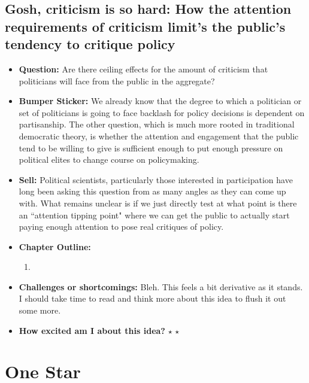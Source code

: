 \documentclass[12pt]{article}
\begin{document}
\subsection{Gosh, criticism is so hard: How the attention requirements of criticism limit's the public's tendency to critique policy}
    \begin{itemize}
        \item \textbf{Question:} Are there ceiling effects for the amount of criticism that politicians will face from the public in the aggregate?
        \item \textbf{Bumper Sticker:} We already know that the degree to which a politician or set of politicians is going to face backlash for policy decisions is dependent on partisanship. The other question, which is much more rooted in traditional democratic theory, is whether the attention and engagement that the public tend to be willing to give is sufficient enough to put enough pressure on political elites to change course on policymaking.
        \item \textbf{Sell:} Political scientists, particularly those interested in participation have long been asking this question from as many angles as they can come up with. What remains unclear is if we just directly test at what point is there an ``attention tipping point" where we can get the public to actually start paying enough attention to pose real critiques of policy. 
        \item \textbf{Chapter Outline:}
        \begin{enumerate}
            \item 
        \end{enumerate}
        \item \textbf{Challenges or shortcomings:} Bleh. This feels a bit derivative as it stands. I should take time to read and think more about this idea to flush it out some more.
        \item \textbf{How excited am I about this idea?} $\star$ $\star$
    \end{itemize}

\section{One Star}
\end{document}
